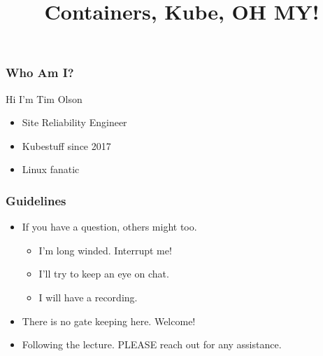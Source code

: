 \documentclass[11pt]{beamer}
\title{Containers, Kube, OH MY!}
\begin{document}
\frame{\titlepage}

\begin{frame}
  \frametitle{Who Am I?}
  Hi I'm Tim Olson
  \begin{itemize}
    \item Site Reliability Engineer
    \item Kubestuff since 2017
    \item Linux fanatic
  \end{itemize}
\end{frame}

\begin{frame}
  \frametitle{Guidelines}
  \begin{itemize}
    \item If you have a question, others might too.
    \begin{itemize}
      \item I'm long winded. Interrupt me!
      \item I'll try to keep an eye on chat.
      \item I will have a recording.
    \end{itemize}
    \item There is no gate keeping here. Welcome!
    \item Following the lecture. PLEASE reach out for any assistance.
  \end{itemize}
\end{frame}
\end{document}
